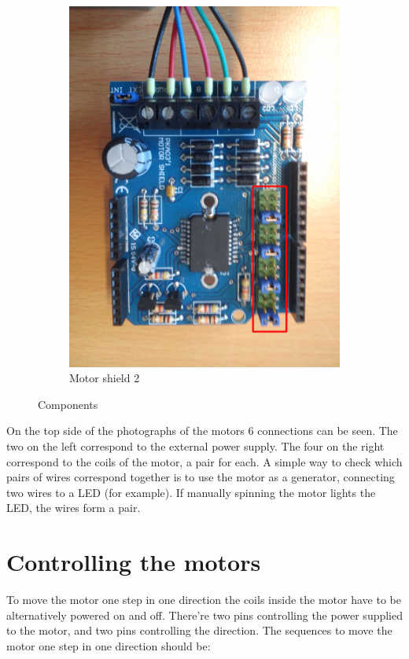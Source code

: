 \documentclass[a4paper,10pt]{article}
\begin{document}
\begin{figure}
\begin{subfigure}[b]{0.32\textwidth}
      \includegraphics[width=\textwidth]{../figures/motor2.jpg}
        \caption{Motor shield 2}
    \end{subfigure}
  \caption{Components}\label{fig:comp}
\end{figure}

On the top side of the photographs of the motors 6 connections can be seen. The two on the left correspond to the external power supply.
The four on the right correspond to the coils of the motor, a pair for each. A simple way to check which pairs of wires correspond together is to
use the motor as a generator, connecting two wires to a LED (for example). If manually spinning the motor lights
the LED, the wires form a pair.

\section{Controlling the motors}

To move the motor one step in one direction the coils inside the motor have to be alternatively powered on and off. There're two pins controlling the power supplied
to the motor, and two pins controlling the direction. The sequences to move the motor one step in one direction should be:
\end{document}
